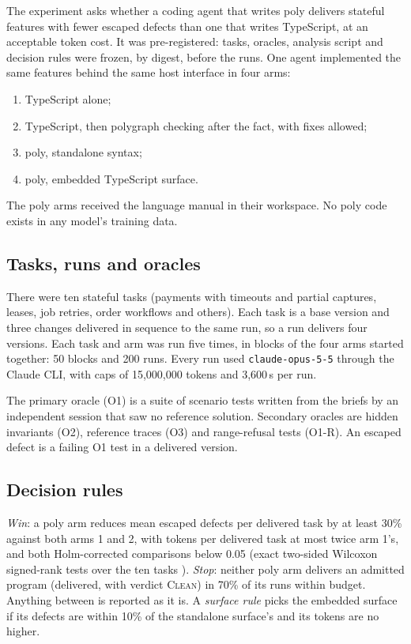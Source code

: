 \documentclass[11pt]{article}
\newcommand{\poly}{\textsf{poly}}
\begin{document}
The experiment asks whether a coding agent that writes \poly{} delivers stateful features with fewer escaped defects than one that writes TypeScript, at an acceptable token cost. It was pre-registered: tasks, oracles, analysis script and decision rules were frozen, by digest, before the runs. One agent implemented the same features behind the same host interface in four arms:
\begin{enumerate}
\item TypeScript alone;
\item TypeScript, then polygraph checking after the fact, with fixes allowed;
\item \poly, standalone syntax;
\item \poly, embedded TypeScript surface.
\end{enumerate}
The \poly{} arms received the language manual in their workspace. No \poly{} code exists in any model's training data.

\subsection{Tasks, runs and oracles}

There were ten stateful tasks (payments with timeouts and partial captures, leases, job retries, order workflows and others). Each task is a base version and three changes delivered in sequence to the same run, so a run delivers four versions. Each task and arm was run five times, in blocks of the four arms started together: 50 blocks and 200 runs. Every run used \texttt{claude-opus-5-5} through the Claude CLI, with caps of 15,000,000 tokens and 3,600\,s per run.

The primary oracle (O1) is a suite of scenario tests written from the briefs by an independent session that saw no reference solution. Secondary oracles are hidden invariants (O2), reference traces (O3) and range-refusal tests (O1-R). An escaped defect is a failing O1 test in a delivered version.

\subsection{Decision rules}

\emph{Win}: a \poly{} arm reduces mean escaped defects per delivered task by at least 30\% against both arms 1 and 2, with tokens per delivered task at most twice arm 1's, and both Holm-corrected \cite{holm1979} comparisons below 0.05 (exact two-sided Wilcoxon signed-rank tests over the ten tasks \cite{wilcoxon1945}). \emph{Stop}: neither \poly{} arm delivers an admitted program (delivered, with verdict \textsc{Clean}) in 70\% of its runs within budget. Anything between is reported as it is. A \emph{surface rule} picks the embedded surface if its defects are within 10\% of the standalone surface's and its tokens are no higher.
\end{document}
